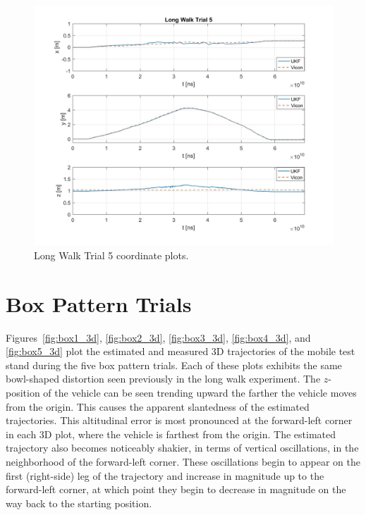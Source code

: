 \begin{figure}[H]
  \centering
    \includegraphics[width=\textwidth]{longWalk5_xyz}
  \caption[Long Walk Trial 5]{Long Walk Trial 5 coordinate plots.}
  \label{fig:longWalk5_xyz}
\end{figure}
\clearpage

\section{Box Pattern Trials}

Figures~\ref{fig:box1_3d}, \ref{fig:box2_3d}, \ref{fig:box3_3d}, \ref{fig:box4_3d}, and \ref{fig:box5_3d} plot the estimated and measured 3D trajectories of the mobile test stand during the five box pattern trials. Each of these plots exhibits the same bowl-shaped distortion seen previously in the long walk experiment. The $z$-position of the vehicle can be seen trending upward the farther the vehicle moves from the origin. This causes the apparent slantedness of the estimated trajectories. This altitudinal error is most pronounced at the forward-left corner in each 3D plot, where the vehicle is farthest from the origin. The estimated trajectory also becomes noticeably shakier, in terms of vertical oscillations, in the neighborhood of the forward-left corner. These oscillations begin to appear on the first (right-side) leg of the trajectory and increase in magnitude up to the forward-left corner, at which point they begin to decrease in magnitude on the way back to the starting position.

